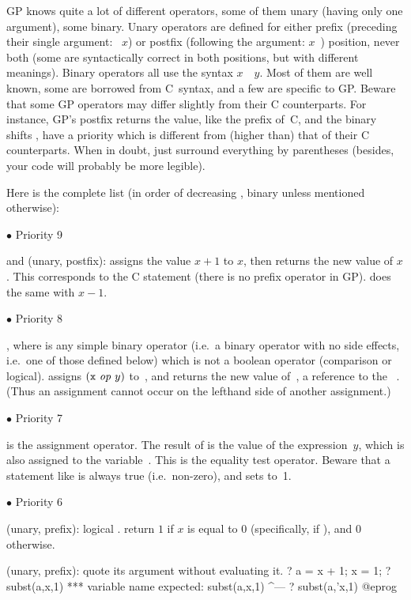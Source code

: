 GP knows quite a lot of different operators, some of them unary (having
only one argument), some binary. Unary operators are defined for either
prefix (preceding their single argument: ~$x$) or postfix (following
the argument: $x$~) position, never both
(some are syntactically correct in both positions, but with different
meanings). Binary operators all use the syntax $x$~~$y$. Most of
them are well known, some are borrowed from C~syntax, and a few are specific
to GP. Beware that some GP operators may differ slightly from their C
counterparts. For instance, GP's postfix \kbd{++} returns the 
value, like the prefix \kbd{++} of~C, and the binary shifts \kbd{<<},
\kbd{>>} have a priority which is different from (higher than) that of
their C counterparts.
When in doubt, just surround everything by parentheses (besides, your code
will probably be more legible).

\noindent Here is the complete list (in order of decreasing ,
binary unless mentioned otherwise):

\def\point#1{\noindent $\bullet$ #1\hfill\break\indent\strut}
\point{Priority 9}
%
\kbd{++} and \kbd{--} (unary, postfix):  assigns the value $x+1$ to
$x$, then returns the new value of $x$. This corresponds to the C
statement  (there is no prefix \kbd{++} operator in GP).
 does the same with $x-1$.

\point{Priority 8}
%
, where  is any simple binary operator
(i.e.~a binary operator with no side effects, i.e.~one of those defined below)
which is not a boolean operator (comparison or logical).
 assigns $({\tt x}~\hbox{\it op\/}~y)$ to~,
and returns the new value of~,  a reference to the
~. (Thus an assignment cannot occur on the lefthand
side of another assignment.)

\point{Priority 7}
%
\kbd{=} is the assignment operator. The result of  is the value
of the expression~$y$, which is also assigned to the variable~. This
is  the equality test operator. Beware that a statement like
 is always true (i.e.~non-zero), and sets  to~1.

\point{Priority 6}
%
\kbd{!} (unary, prefix): logical .  return $1$ if $x$ is
equal to $0$ (specifically, if ), and $0$ otherwise.

 (unary, prefix): quote its argument without evaluating it.
\bprog
? a = x + 1; x = 1;
? subst(a,x,1)
  ***   variable name expected: subst(a,x,1)
                                        ^---
? subst(a,'x,1)
@eprog

